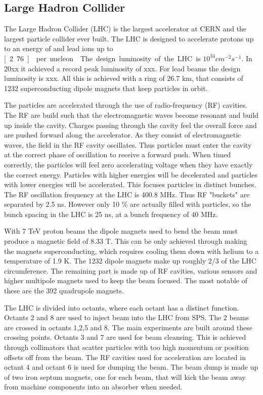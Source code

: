 \subsection{Large Hadron Collider}
\label{sec:lhc}
The Large Hadron Collider (LHC) is the largest accelerator at CERN and the largest particle collider ever built. The LHC is designed to accelerate protons up to an energy of \unit[8]{\tev} and lead ions up to \unit[2.76]{\tev} per nucleon~\cite{LHC}. The design luminosity of the LHC is $10^34 \unit{cm^{-2}s^{-1}}$. In 20xx it achieved a record peak luminosity of xxx. For lead beams the design luminosity is xxx. All this is achieved with a ring of 26.7 km, that consists of 1232 superconducting dipole magnets that keep particles in orbit. 

The particles are accelerated through the use of radio-frequency (RF) cavities. The RF are build such that the electromagnetic waves become resonant and build up inside the cavity. Charges passing through the cavity feel the overall force and are pushed forward along the accelerator. As they consist of electromagnetic waves, the field in the RF cavity oscillates. Thus particles must enter the cavity at the correct phase of oscillation to receive a forward push. When timed correctly, the particles will feel zero accelerating voltage when they have exactly the correct energy. Particles with higher energies will be decelerated  and particles with lower energies will be accelerated. This focuses particles in distinct bunches. The RF oscillation frequency at the LHC is 400.8 MHz. Thus  RF "buckets" are separated by 2.5 ns. However only 10 \% are actually filled with particles, so the bunch spacing in the LHC is 25 ns, at a bunch frequency of 40 MHz.

With 7 TeV proton beams the dipole magnets used to bend the beam must produce a magnetic field of 8.33 T. This can be only achieved through making the magnets superconducting, which requires cooling them down with helium to a temperature of 1.9 K. The 1232 dipole magnets make up roughly 2/3 of the LHC circumference. The remaining part is made up of RF cavities, various sensors and higher multipole magnets used to keep the beam focused. The most notable of these are the 392 quadrupole magnets.

The LHC is divided into octants, where each octant has a distinct function. Octants 2 and 8 are used to inject beam into the LHC from SPS. The 2 beams are crossed in octants 1,2,5 and 8. The main experiments are built around these crossing points. Octants 3 and 7 are used for beam cleansing. This is achieved through collimators that scatter particles with too high momentum or position offsets off from the beam. The RF cavities used for acceleration are located in octant 4 and octant 6 is used for dumping the beam. The beam dump is made up of two iron septum magnets, one for each beam, that will kick the beam away from machine components into an absorber when needed. 


